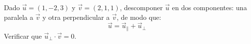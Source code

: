 Dado $\vec{u} = (1, -2, 3)$ y $\vec{v} = (2, 1, 1)$, descomponer $\vec{u}$ en dos componentes: una paralela a $\vec{v}$ y otra perpendicular a $\vec{v}$, de modo que:
\[ \vec{u} = \vec{u}_{\parallel} + \vec{u}_{\perp} \]
Verificar que $\vec{u}_\perp \cdot \vec{v} = 0$.